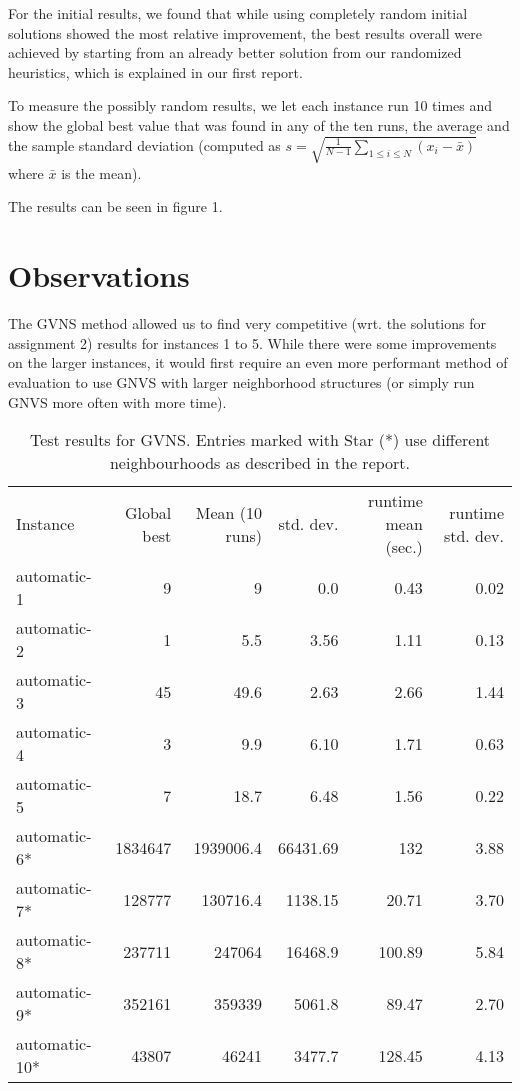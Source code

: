 \documentclass [11pt]{article}
\begin{document}
For the initial results, we found that while using completely random initial solutions showed the most relative improvement, the best results overall were achieved by starting from an already better solution from our randomized heuristics, which is explained in our first report. 

To measure the possibly random results, we let each instance run 10 times and show the global best value that was found in any of the ten runs, the average and the sample standard deviation (computed as $ s = \sqrt{\frac{1}{N - 1} \sum_{1\leq i \leq N}{(x_i - \bar{x})}}$ where $\bar{x}$ is the mean). 

The results can be seen in figure 1.


\section{Observations}
The GVNS method allowed us to find very competitive (wrt. the solutions for assignment 2) results for instances 1 to 5. While there were some improvements on the larger instances, it would first require an even more performant method of evaluation to use GNVS with larger neighborhood structures (or simply run GNVS more often with more time). 

\newpage

\begin{sidewaystable}
  \centering
 \label{fig:results}
  \everyrow{\hline}
  \begin{tabu} {| l |r | r |r |r|r |}
  Instance        & Global best   & Mean (10 runs)   & std. dev. & runtime mean (sec.) & runtime std. dev.    \\ 
  automatic-1     & 9             & 9                   & 0.0           &  0.43 & 0.02       \\ 
  automatic-2     & 1             & 5.5                 & 3.56          &  1.11 & 0.13       \\ 
  automatic-3     & 45            & 49.6                & 2.63          &  2.66 & 1.44        \\ 
  automatic-4     & 3             & 9.9                 & 6.10          &  1.71 & 0.63        \\ 
  automatic-5     & 7             & 18.7                & 6.48          &  1.56 & 0.22        \\ 
  automatic-6*     & 1834647       & 1939006.4           & 66431.69      &  132 & 3.88        \\ 
  automatic-7*     & 128777        & 130716.4            & 1138.15       &  20.71 & 3.70        \\ 
  automatic-8*     & 237711        & 247064              & 16468.9       &  100.89 & 5.84        \\ 
  automatic-9*     & 352161        & 359339              & 5061.8        &  89.47 & 2.70        \\ 
  automatic-10*    & 43807         & 46241               & 3477.7        &  128.45 & 4.13        \\ 
\end{tabu}
\caption{Test results for GVNS. Entries marked with Star (*) use different neighbourhoods as described in the report.} 
\end{sidewaystable}
\end{document}
